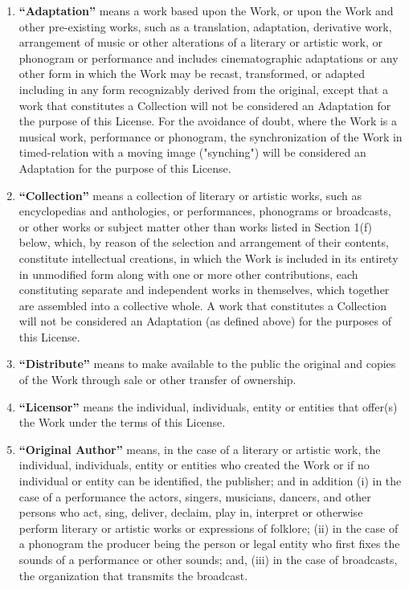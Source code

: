 \begin{enumerate}
\item \textbf{``Adaptation''} means a work based upon the Work, or upon the Work and other pre-existing works, such as a translation, adaptation, derivative work, arrangement of music or other alterations of a literary or artistic work, or phonogram or performance and includes cinematographic adaptations or any other form in which the Work may be recast, transformed, or adapted including in any form recognizably derived from the original, except that a work that constitutes a Collection will not be considered an Adaptation for the purpose of this License. For the avoidance of doubt, where the Work is a musical work, performance or phonogram, the synchronization of the Work in timed-relation with a moving image ("synching") will be considered an Adaptation for the purpose of this License.

\item \textbf{``Collection''} means a collection of literary or artistic works, such as encyclopedias and anthologies, or performances, phonograms or broadcasts, or other works or subject matter other than works listed in Section 1(f) below, which, by reason of the selection and arrangement of their contents, constitute intellectual creations, in which the Work is included in its entirety in unmodified form along with one or more other contributions, each constituting separate and independent works in themselves, which together are assembled into a collective whole. A work that constitutes a Collection will not be considered an Adaptation (as defined above) for the purposes of this License.

\item \textbf{``Distribute''} means to make available to the public the original and copies of the Work through sale or other transfer of ownership.

\item \textbf{``Licensor''} means the individual, individuals, entity or entities that offer(s) the Work under the terms of this License.

\item \textbf{``Original Author''} means, in the case of a literary or artistic work, the individual, individuals, entity or entities who created the Work or if no individual or entity can be identified, the publisher; and in addition (i) in the case of a performance the actors, singers, musicians, dancers, and other persons who act, sing, deliver, declaim, play in, interpret or otherwise perform literary or artistic works or expressions of folklore; (ii) in the case of a phonogram the producer being the person or legal entity who first fixes the sounds of a performance or other sounds; and, (iii) in the case of broadcasts, the organization that transmits the broadcast.


\end{enumerate}

